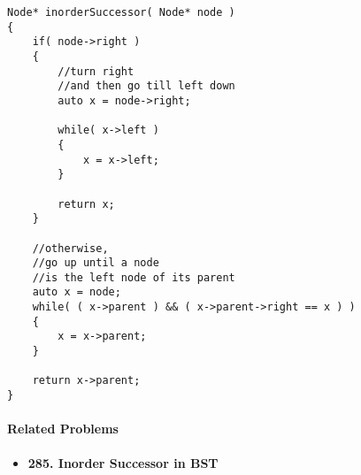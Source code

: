 \setcounter{lstlisting}{0}
\begin{lstlisting}[style=customc, caption={Iteration}]
Node* inorderSuccessor( Node* node )
{
    if( node->right )
    {
        //turn right
        //and then go till left down
        auto x = node->right;

        while( x->left )
        {
            x = x->left;
        }

        return x;
    }

    //otherwise,
    //go up until a node
    //is the left node of its parent
    auto x = node;
    while( ( x->parent ) && ( x->parent->right == x ) )
    {
        x = x->parent;
    }

    return x->parent;
}
\end{lstlisting}

\paragraph{Related Problems}
\begin{itemize}
\item \textbf{285. Inorder Successor in BST}
\end{itemize}
